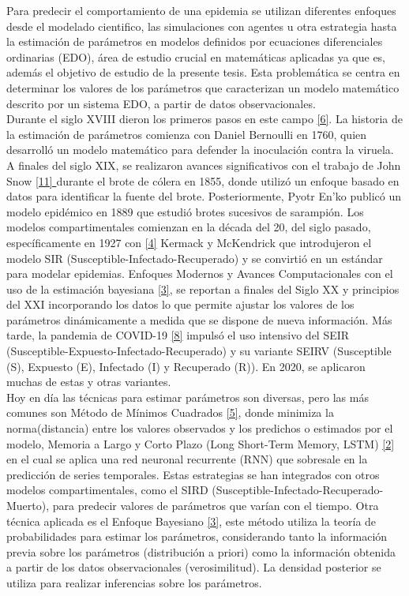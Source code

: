 \documentclass{article}
\begin{document}
Para predecir el comportamiento de una epidemia se utilizan diferentes enfoques desde el modelado cientifico, las simulaciones con agentes u otra estrategia hasta la estimación de parámetros en 
modelos definidos por ecuaciones diferenciales ordinarias (EDO), área de estudio crucial en matemáticas aplicadas ya que es, además el objetivo de estudio de la presente tesis. Esta problemática se centra en determinar los valores de los parámetros que caracterizan un modelo matemático descrito por un sistema EDO, a partir de datos observacionales. \\

Durante el siglo XVIII dieron los primeros pasos en este campo \hyperref[sec:6]{[6]}. La historia de la estimación de parámetros comienza con Daniel Bernoulli en 1760, quien desarrolló un modelo matemático para defender la inoculación contra la viruela. A finales del siglo XIX, se realizaron avances significativos con el trabajo de John Snow \hyperref[sec:11]{[11] } durante el brote de cólera en 1855, donde utilizó un enfoque basado en datos para identificar la fuente del brote. Posteriormente, Pyotr En'ko publicó un modelo epidémico en 1889 que estudió brotes sucesivos de sarampión. Los modelos compartimentales comienzan en la década del 20, del siglo pasado, específicamente en 1927 con \hyperref[sec:4]{[4]} Kermack y McKendrick que introdujeron el modelo SIR (Susceptible-Infectado-Recuperado) y se convirtió en un estándar para modelar epidemias. Enfoques Modernos y Avances Computacionales con el uso de la estimación bayesiana \hyperref[sec:3]{[3]}, se reportan a finales del Siglo XX y principios del XXI incorporando los datos lo que permite ajustar los valores de los parámetros dinámicamente a medida que se dispone de nueva información. Más tarde, la pandemia de COVID-19 \hyperref[sec:8]{[8]} impulsó el uso intensivo del SEIR (Susceptible-Expuesto-Infectado-Recuperado) y su variante SEIRV (Susceptible (S), Expuesto (E), Infectado (I) y Recuperado (R)). En 2020, se aplicaron muchas de estas y otras variantes. \\

Hoy en día las técnicas para estimar parámetros son diversas, pero las más comunes son Método de Mínimos Cuadrados \hyperref[sec:5]{ [5]}, donde minimiza la norma(distancia) entre los valores observados y los predichos o estimados por el modelo, Memoria a Largo y Corto Plazo (Long Short-Term Memory, LSTM) \hyperref[sec:2]{ [2]} en el cual se aplica una red neuronal recurrente (RNN) que sobresale en la predicción de series temporales. Estas estrategias se han integrados con otros modelos compartimentales, como el SIRD (Susceptible-Infectado-Recuperado-Muerto), para predecir valores de parámetros que varían con el tiempo. Otra técnica aplicada es el Enfoque Bayesiano \hyperref[sec:3]{[3]}, este método utiliza la teoría de probabilidades para estimar los parámetros, considerando tanto la información previa sobre los parámetros (distribución a priori) como la información obtenida a partir de los datos observacionales (verosimilitud). La densidad posterior se utiliza para realizar inferencias sobre los parámetros. \\
\end{document}
